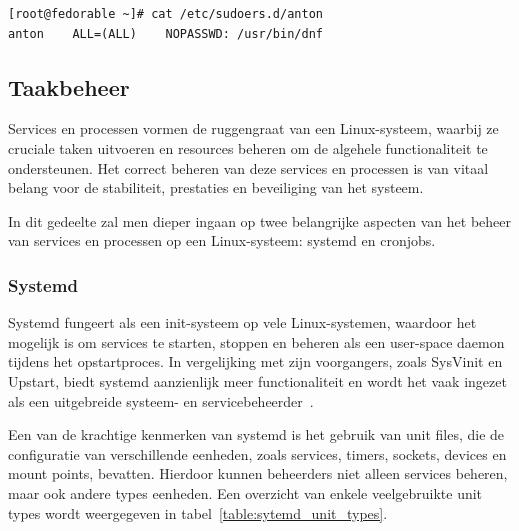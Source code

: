 \begin{listing}
  \begin{verbatim}
[root@fedorable ~]# cat /etc/sudoers.d/anton
anton    ALL=(ALL)    NOPASSWD: /usr/bin/dnf
  \end{verbatim}
    \caption[Inhoud van \texttt{/etc/sudoers.d/anton}.]{Uitvoer van het \texttt{cat}-commando dat de inhoud van het bestand \texttt{/etc/sudoers.d/anton} laat zien. Hieruit blijkt dat de gebruiker \texttt{anton} root-privileges heeft voor het uitvoeren van het \texttt{dnf}-commando en geen wachtwoord hoeft in te voeren bij dit commando.}
  \label{lst:linux-sudoers}
\end{listing}

\subsection{Taakbeheer}
\label{linux_taakbeheer}

Services en processen vormen de ruggengraat van een Linux-systeem, waarbij ze cruciale taken uitvoeren en resources beheren om de algehele functionaliteit te ondersteunen.
Het correct beheren van deze services en processen is van vitaal belang voor de stabiliteit, prestaties en beveiliging van het systeem.

In dit gedeelte zal men dieper ingaan op twee belangrijke aspecten van het beheer van services en processen op een Linux-systeem: systemd en cronjobs.

\subsubsection{Systemd}
\label{linux_systemd}

Systemd fungeert als een init-systeem op vele Linux-systemen, waardoor het mogelijk is om services te starten, stoppen en beheren als een user-space daemon tijdens het opstartproces.
In vergelijking met zijn voorgangers, zoals SysVinit en Upstart, biedt systemd aanzienlijk meer functionaliteit en wordt het vaak ingezet als een uitgebreide systeem- en servicebeheerder~\autocite{ward2021linux}.

Een van de krachtige kenmerken van systemd is het gebruik van unit files, die de configuratie van verschillende eenheden, zoals services, timers, sockets, devices en mount points, bevatten.
Hierdoor kunnen beheerders niet alleen services beheren, maar ook andere types eenheden.
Een overzicht van enkele veelgebruikte unit types wordt weergegeven in tabel~\ref{table:sytemd_unit_types}.

